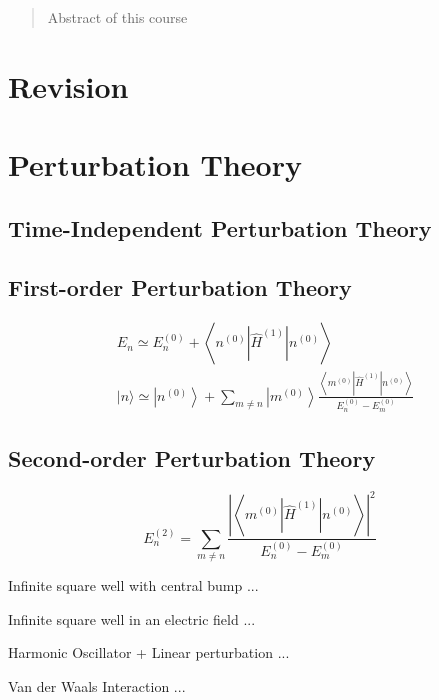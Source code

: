 \documentclass[12pt,a4paper]{article}
\begin{document}
\begin{titlepage}
    \maketitle
\end{titlepage}

\tableofcontents

\newpage

\begin{abstract}
\noindent
Abstract of this course
\end{abstract}

\section{Revision}
\section{Perturbation Theory}
\subsection{Time-Independent Perturbation Theory}
\subsection{First-order Perturbation Theory}
$$
\begin{aligned} & E_n \simeq E_n^{(0)}+\left\langle n^{(0)}\left|\hat{H}^{(1)}\right| n^{(0)}\right\rangle \\ & |n\rangle \simeq\left|n^{(0)}\right\rangle+\sum_{m \neq n}\left|m^{(0)}\right\rangle \frac{\left\langle m^{(0)}\left|\hat{H}^{(1)}\right| n^{(0)}\right\rangle}{E_n^{(0)}-E_m^{(0)}}\end{aligned}
$$
\subsection{Second-order Perturbation Theory}
$$E_n^{(2)}=\sum_{m \neq n} \frac{\left|\left\langle m^{(0)}\left|\hat{H}^{(1)}\right| n^{(0)}\right\rangle\right|^2}{E_n^{(0)}-E_m^{(0)}}$$

\begin{example}
    {Infinite square well with central bump}
    {...}
\end{example}
\begin{example}
    {Infinite square well in an electric field}
    {...}
\end{example}
\begin{example}
    {Harmonic Oscillator + Linear perturbation}
    {...}
\end{example}
\begin{example}
    {Van der Waals Interaction}
    {...}
\end{example}
\end{document}

